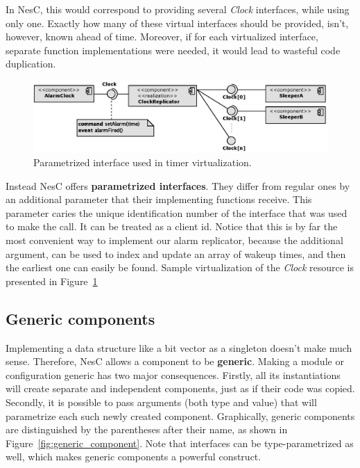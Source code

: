 In NesC, this would correspond to providing several \emph{Clock} interfaces, while using only one. Exactly how many of these virtual interfaces should be provided, isn't, however, known ahead of time.  Moreover, if for each virtualized interface, separate function implementations were needed, it would lead to wasteful code duplication.

\begin{figure}[h]
  \centering
  \includegraphics[width=1.0\textwidth]{diagrams/parametrized_interface.eps}
  \caption{Parametrized interface used in timer virtualization.}
  \label{fig:parametrized_interface}
\end{figure}

Instead NesC offers {\bf parametrized interfaces}. They differ from regular ones by an additional parameter that their implementing functions receive. This parameter caries the unique identification number of the interface that was used to make the call. It can be treated as a client id.   Notice that this is by far the most convenient way to implement our alarm replicator, because the additional argument, can be used to index and update an array of wakeup times, and then the earliest one can easily be found. Sample virtualization of the \emph{Clock} resource is presented in Figure~\ref{fig:parametrized_interface}

\subsection{Generic components}

Implementing a data structure like a bit vector as a singleton doesn't make much sense. Therefore, NesC allows a component to be {\bf generic}. Making a module or configuration generic has two major consequences. Firstly, all its instantiations will create separate and independent components, just as if their code was copied. Secondly, it is possible to pass arguments (both type and value) that will parametrize each such newly created component. Graphically, generic components are distinguished by the parentheses after their name, as shown in Figure~\ref{fig:generic_component}. Note that interfaces
can be type-parametrized as well, which makes generic components a powerful construct.

